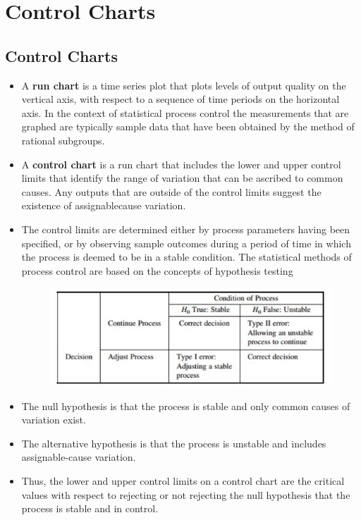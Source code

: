 \documentclass[]{report}
\begin{document}
{\chapter{Control Charts}


\section{Control Charts}
\begin{itemize}
\item A \textbf{run chart} is a time series plot that plots levels of output quality on the vertical axis,
with respect to a sequence of time periods on the horizontal axis. In the context of
statistical process control the measurements that are graphed are typically sample
data that have been obtained by the method of rational subgroups.
\item A \textbf{control chart} is a run chart that includes the lower and upper control limits that
identify the range of variation that can be ascribed to common causes.
Any outputs that are outside of the control limits suggest the existence of assignablecause
variation.
\item The control limits are determined either by process parameters having been
specified, or by observing sample outcomes during a period of time in which the
process is deemed to be in a stable condition.
The statistical methods of process control are based on the concepts of hypothesis
testing 
\begin{figure}
\centering
\includegraphics[width=0.7\linewidth]{images/ProcessErrors}

\end{figure}

\item The null hypothesis is that the process is stable and only common causes of
variation exist.
\item The alternative hypothesis is that the process is unstable and includes
assignable-cause variation.
\item Thus, the lower and upper control limits on a control chart are the critical values with
respect to rejecting or not rejecting the null hypothesis that the process is stable and
in control.


\end{itemize}}
\end{document}
